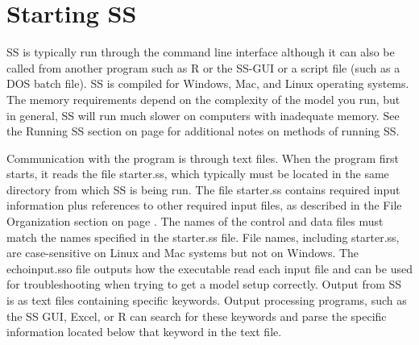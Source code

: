 \section{Starting SS}
SS is typically run through the command line interface although it can also be called from another program such as R or the SS-GUI or a script file (such as a DOS batch file). SS is compiled for Windows, Mac, and Linux operating systems. The memory requirements depend on the complexity of the model you run, but in general, SS will run much slower on computers with inadequate memory. See the Running SS section on page \pageref{sec:RunningSS} for additional notes on methods of running SS.

Communication with the program is through text files.  When the program first starts, it reads the file starter.ss, which typically must be located in the same directory from which SS is being run.  The file starter.ss contains required input information plus references to other required input files, as described in the File Organization section on page \pageref{FileOrganization}.  The names of the control and data files must match the names specified in the starter.ss file.  File names, including starter.ss, are case-sensitive on Linux and Mac systems but not on Windows. The echoinput.sso file outputs how the executable read each input file and can be used for troubleshooting when trying to get a model setup correctly.  Output from SS is as text files containing specific keywords.  Output processing programs, such as the SS GUI, Excel, or R can search for these keywords and parse the specific information located below that keyword in the text file.

